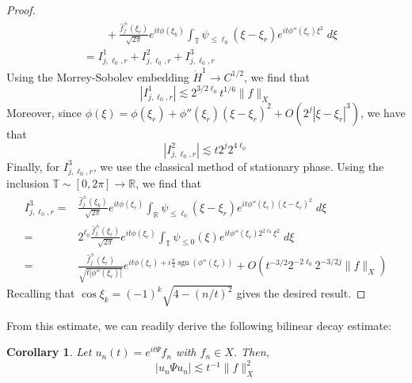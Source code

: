 \documentclass[letterpaper, reqno,final]{amsart}
\DeclareMathOperator{\sgn}{sgn}
\newcommand{\bbR}{\mathbb{R}}
\newcommand{\bbT}{\mathbb{T}}
\newcommand{\discrAvg}{\Psi}
\newcommand{\linProp}[1][t]{e^{i#1\discrAvg}}
\newtheorem{cor}[thm]{Corollary}
\begin{document}
\begin{proof}
\begin{equation*}
\begin{split}
       &\qquad + \frac{\hat{f}^{\pm}_j(\xi_r)}{\sqrt{2\pi}} e^{it\phi(\xi_k)} \int_{\bbT} \psi_{\leq \ell_0}(\xi - \xi_r) e^{it\phi''(\xi_r) \xi^2}\;d\xi\\
       &= I_{j,\ell_0,r}^1 + I_{j,\ell_0,r}^2 + I_{j,\ell_0,r}^3
   \end{split}\end{equation*}
   Using the Morrey-Sobolev embedding $\dot{H}^1 \to C^{1/2}$, we find that
   \begin{equation*}
       |I^1_{j,\ell_0,r}| \lesssim 2^{3/2\ell_0} t^{1/6} \lVert f \rVert_{X}
   \end{equation*}
   Moreover, since $\phi(\xi) = \phi(\xi_r) + \phi''(\xi_r) (\xi-\xi_r)^2 + O(2^j |\xi-\xi_r|^3)$, we have that
   \begin{equation*}
       |I^2_{j,\ell_0, r}| \lesssim t 2^j 2^{4\ell_0}
   \end{equation*}
   Finally, for $I^3_{j,\ell_0,r}$, we use the classical method of stationary phase.  Using the inclusion $\bbT \sim [0,2\pi] \to \bbR$, we find that
   \begin{equation*}\begin{split}
       I^3_{j,\ell_0,r} =& \frac{\hat{f}^{\pm}_j(\xi_k)}{\sqrt{2\pi}} e^{it\phi(\xi_r)} \int_{\bbR} \psi_{\leq \ell_0}(\xi - \xi_r) e^{it\phi''(\xi_r) (\xi-\xi_r)^2}\;d\xi\\
       =& 2^{\ell_0}\frac{\hat{f}^{\pm}_j(\xi_r)}{\sqrt{2\pi}} e^{it\phi(\xi_r)} \int_{\bbT} \psi_{\leq 0}(\xi) e^{it\phi''(\xi_r)2^{2\ell_0} \xi^2}\;d\xi\\
       =& \frac{\hat{f}^{\pm}_j(\xi_r)}{\sqrt{t|\phi''(\xi_r)|}} e^{it\phi(\xi_r) + i \frac{\pi}{4} \sgn(\phi''(\xi_r))} + O(t^{-3/2} 2^{-2\ell_0} 2^{-3/2j}\lVert f \rVert_{X})
   \end{split}\end{equation*}
   Recalling that $\cos \xi_k = (-1)^k \sqrt{4 - (n/t)^2}$ gives the desired result.
\end{proof}

From this estimate, we can readily derive the following bilinear decay estimate:	
\begin{cor}\label{cor:decay-estim}
	Let $u_n(t) = \linProp f_n$ with $f_n \in X$.  Then,
	\begin{equation*}
	    |u_n \Psi u_n| \lesssim t^{-1} \lVert f \rVert_X^2
	\end{equation*}
\end{cor}
\end{document}
